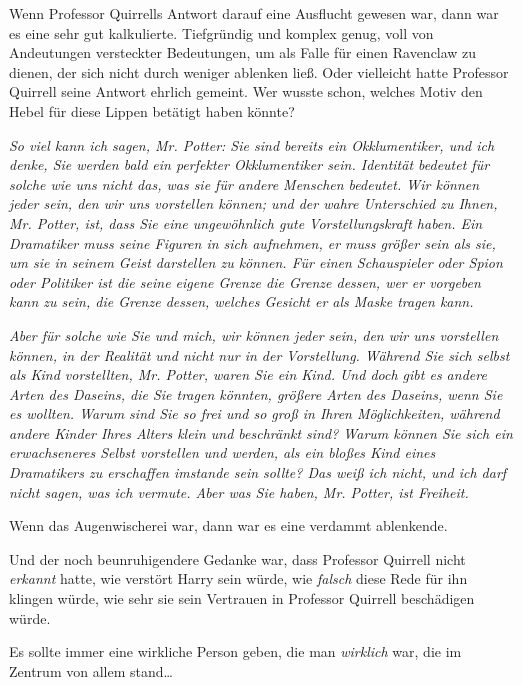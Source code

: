{Wenn Professor Quirrells Antwort darauf eine Ausflucht gewesen war, dann war es eine sehr gut kalkulierte. Tiefgründig und komplex genug, voll von Andeutungen versteckter Bedeutungen, um als Falle für einen Ravenclaw zu dienen, der sich nicht durch weniger ablenken ließ. Oder vielleicht hatte Professor Quirrell seine Antwort ehrlich gemeint. Wer wusste schon, welches Motiv den Hebel für diese Lippen betätigt haben könnte?

\emph{\emph{So viel kann ich sagen, Mr. Potter: Sie sind bereits ein Okklumentiker, und ich denke, Sie werden bald ein perfekter Okklumentiker} \emph{sein. Identität bedeutet für solche wie uns nicht das, was sie für andere Menschen bedeutet.} \emph{Wir können} \emph{jeder sein, den wir uns vorstellen können; und der wahre Unterschied zu Ihnen, Mr. Potter, ist, dass Sie eine ungewöhnlich gute Vorstellungskraft haben. Ein Dramatiker muss seine Figuren in sich aufnehmen, er muss größer sein als sie, um sie in seinem Geist darstellen zu können. Für einen Schauspieler oder Spion oder Politiker ist die seine eigene Grenze die Grenze dessen, wer er vorgeben kann zu sein, die Grenze dessen, welches Gesicht er als Maske tragen} \emph{kann.}}

\emph{\emph{Aber für solche wie Sie und} \emph{mich,} \emph{wir können jeder sein, den wir uns vorstellen können, in der Realität und nicht} \emph{nur in der Vorstellung. Während Sie sich} \emph{selbst als} \emph{Kind vorstellten, Mr. Potter,} waren \emph{Sie ein Kind. Und doch gibt es andere} \emph{Arten des Daseins, die Sie} \emph{tragen} \emph{könnten, größere} \emph{Arten des Daseins, wenn Sie es wollten. Warum} \emph{sind Sie} \emph{so frei und so groß in} \emph{Ihren Möglichkeiten, während andere Kinder} \emph{Ihres} \emph{Alters klein und beschränkt sind? Warum können Sie sich} \emph{ein erwachseneres Selbst vorstellen und} werden\emph{, als ein bloßes Kind eines Dramatikers zu} \emph{erschaffen} \emph{imstande sein sollte? Das weiß ich nicht, und ich darf nicht sagen, was ich vermute. Aber was Sie haben, Mr. Potter, ist Freiheit.}}

Wenn das Augenwischerei war, dann war es eine verdammt ablenkende.

Und der noch beunruhigendere Gedanke war, dass Professor Quirrell nicht \emph{erkannt} hatte, wie verstört Harry sein würde, wie \emph{falsch} diese Rede für ihn klingen würde, wie sehr sie sein Vertrauen in Professor Quirrell beschädigen würde.

Es sollte immer eine wirkliche Person geben, die man \emph{wirklich} war, die im Zentrum von allem stand…

}
